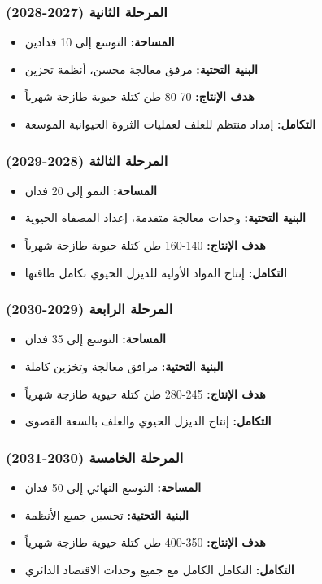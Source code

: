 \subsubsection{المرحلة الثانية (2027-2028)}
\begin{itemize}
    \item \textbf{المساحة:} التوسع إلى 10 فدادين
    \item \textbf{البنية التحتية:} مرفق معالجة محسن، أنظمة تخزين
    \item \textbf{هدف الإنتاج:} 70-80 طن كتلة حيوية طازجة شهرياً
    \item \textbf{التكامل:} إمداد منتظم للعلف لعمليات الثروة الحيوانية الموسعة
\end{itemize}

\subsubsection{المرحلة الثالثة (2028-2029)}
\begin{itemize}
    \item \textbf{المساحة:} النمو إلى 20 فدان
    \item \textbf{البنية التحتية:} وحدات معالجة متقدمة، إعداد المصفاة الحيوية
    \item \textbf{هدف الإنتاج:} 140-160 طن كتلة حيوية طازجة شهرياً
    \item \textbf{التكامل:} إنتاج المواد الأولية للديزل الحيوي بكامل طاقتها
\end{itemize}

\subsubsection{المرحلة الرابعة (2029-2030)}
\begin{itemize}
    \item \textbf{المساحة:} التوسع إلى 35 فدان
    \item \textbf{البنية التحتية:} مرافق معالجة وتخزين كاملة
    \item \textbf{هدف الإنتاج:} 245-280 طن كتلة حيوية طازجة شهرياً
    \item \textbf{التكامل:} إنتاج الديزل الحيوي والعلف بالسعة القصوى
\end{itemize}

\subsubsection{المرحلة الخامسة (2030-2031)}
\begin{itemize}
    \item \textbf{المساحة:} التوسع النهائي إلى 50 فدان
    \item \textbf{البنية التحتية:} تحسين جميع الأنظمة
    \item \textbf{هدف الإنتاج:} 350-400 طن كتلة حيوية طازجة شهرياً
    \item \textbf{التكامل:} التكامل الكامل مع جميع وحدات الاقتصاد الدائري
\end{itemize}

